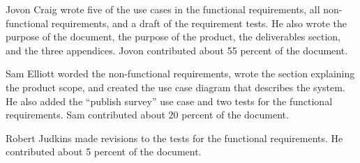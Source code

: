 \documentclass{article}
\begin{document}
Jovon Craig wrote five of the use cases in the functional requirements, all non-functional requirements, and a draft of the requirement tests. He also wrote the purpose of the document, the purpose of the product, the deliverables section, and the three appendices. Jovon contributed about 55 percent of the document.

Sam Elliott worded the non-functional requirements, wrote the section explaining the product scope, and created the use case diagram that describes the system.  He also added the ``publish survey'' use case and two tests for the functional requirements.   Sam contributed about 20 percent of the document.

Robert Judkins made revisions to the tests for the functional requirements. He contributed about 5 percent of the document.
\end{document}
